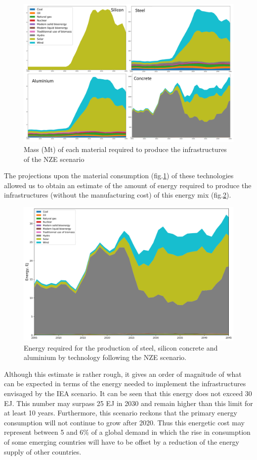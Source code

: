 \documentclass[conference]{IEEEtran}
\begin{document}
\begin{figure}
    \centering
    \includegraphics[scale=0.65]{massscen.png}
    \caption{Mass (Mt) of each material required to produce the infrastructures of the NZE scenario}
    \label{massnze}
\end{figure}
The projections upon the material consumption (fig.\ref{massnze}) of these technologies allowed us to obtain an estimate of the amount of energy required to produce the infrastructures (without the manufacturing cost) of this energy mix (fig.\ref{energynze}). 
\begin{figure}
    \centering
    \includegraphics[scale=0.2]{energy-time.png}
    \caption{Energy required for the production of steel, silicon concrete and aluminium by technology following the NZE scenario.}
    \label{energynze}
\end{figure}
Although this estimate is rather rough, it gives an order of magnitude of what can be expected in terms of the energy needed to implement the infrastructures envisaged by the IEA scenario. It can be seen that this energy does not exceed 30 EJ. This number may surpass 25 EJ in 2030 and remain higher than this limit for at least 10 years. Furthermore, this scenario reckons that the primary energy consumption will not continue to grow after 2020. Thus this energetic cost may represent between 5 and 6\% of a global demand in which the rise in consumption of some emerging countries will have to be offset by a reduction of the energy supply of other countries. \\
\end{document}
